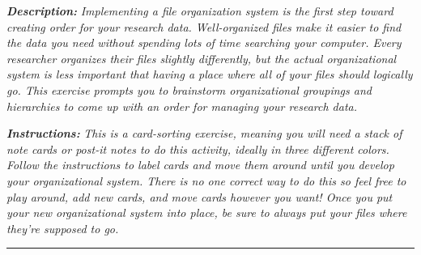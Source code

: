 \documentclass[
]{book}
\begin{document}
\textbf{\emph{Description:}} \emph{Implementing a file organization system is the first step toward creating order for your research data. Well-organized files make it easier to find the data you need without spending lots of time searching your computer. Every researcher organizes their files slightly differently, but the actual organizational system is less important that having a place where all of your files should logically go. This exercise prompts you to brainstorm organizational groupings and hierarchies to come up with an order for managing your research data.}

\textbf{\emph{Instructions:}} \emph{This is a card-sorting exercise, meaning you will need a stack of note cards or post-it notes to do this activity, ideally in three different colors. Follow the instructions to label cards and move them around until you develop your organizational system. There is no one correct way to do this so feel free to play around, add new cards, and move cards however you want! Once you put your new organizational system into place, be sure to always put your files where they're supposed to go.}

\begin{center}\rule{0.5\linewidth}{0.5pt}\end{center}
\end{document}
